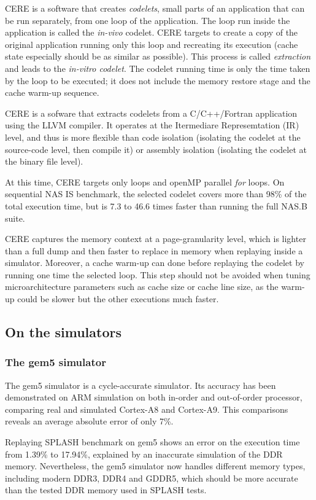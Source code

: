 \documentclass{article}
\begin{document}
\begin{multicols}{2}
CERE is a software that creates \textit{codelets}, small parts of an application that can be run separately, from one loop of the application.
The loop run inside the application is called the \textit{in-vivo} codelet. CERE targets to create a copy of the original application running only this loop and recreating its execution (cache state especially should be as similar as possible). This process is called \textit{extraction} and leads to the \textit{in-vitro codelet}. The codelet running time is only the time taken by the loop to be executed; it does not include the memory restore stage and the cache warm-up sequence. 


CERE is a sofware that extracts codelets from a C/C++/Fortran application using the LLVM compiler. It operates at the Itermediare Represemtation (IR) level, and thus is more flexible than code isolation (isolating the codelet at the source-code level, then compile it) or assembly isolation (isolating the codelet at the binary file level)\cite{CERE}. 


At this time, CERE targets only loops and openMP parallel \textit{for} loops. On sequential NAS IS benchmark, the selected codelet covers more than 98\% of the total execution time, but is 7.3 to 46.6 times faster than running the full NAS.B suite.


CERE captures the memory context at a page-granularity level, which is lighter than a full dump and then faster to replace in memory when replaying inside a simulator. Moreover, a cache warm-up can done before replaying the codelet by running one time the selected loop. 
This step should not be avoided when tuning microarchitecture parameters such as cache size or cache line size, as the warm-up could be slower but the other executions much faster.


\subsection{On the simulators}
\subsubsection*{The gem5 simulator}
The gem5 simulator is a cycle-accurate simulator. Its accuracy has been demonstrated on ARM simulation on both in-order and out-of-order processor, comparing real and simulated Cortex-A8 and Cortex-A9\cite{DBLP:conf/samos/EndoCC14}. This comparisons reveals an average absolute error of only 7\%.

Replaying SPLASH benchmark on gem5 shows an error on the execution time from 1.39\% to 17.94\%, explained by an inaccurate simulation of the DDR memory. Nevertheless, the gem5 simulator now handles different memory types, including modern DDR3, DDR4 and GDDR5, which should be more accurate than the tested DDR memory used in SPLASH tests\cite{DBLP:conf/recosoc/ButkoGOS12}.



\end{multicols}
\end{document}
